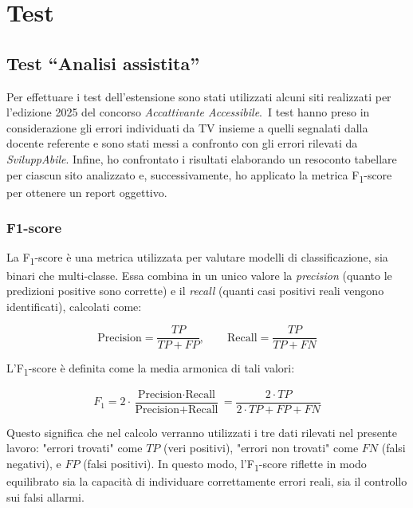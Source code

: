 
\DeclareRobustCommand{\wcagref}[2][]{%
  \hyperref[#1]{\textcolor{emerald}{#2}}%
}

\chapter{Test}
\label{chap:test}

\section{Test ``Analisi assistita''}
\noindent Per effettuare i test dell’estensione sono stati utilizzati alcuni siti realizzati per l'edizione 2025 del concorso \textit{Accattivante Accessibile}.\
I test hanno preso in considerazione gli errori individuati da TV insieme a quelli segnalati dalla docente referente e sono stati messi a confronto con gli errori rilevati da \textit{SviluppAbile}.
Infine, ho confrontato i risultati elaborando un resoconto tabellare per ciascun sito analizzato e, successivamente, ho applicato la metrica F\textsubscript{1}-score per ottenere un report oggettivo.

\subsection{F1-score}
\noindent La F\textsubscript{1}-score è una metrica utilizzata per valutare modelli di classificazione, sia binari che multi‐classe. Essa combina in un unico valore la \textit{precision} (quanto le predizioni positive sono corrette) e il \textit{recall} (quanti casi positivi reali vengono identificati), calcolati come:

\[
\text{Precision} = \frac{TP}{TP + FP}, 
\qquad
\text{Recall} = \frac{TP}{TP + FN}
\]

\vspace{0.5cm}
\noindent L’F\textsubscript{1}-score è definita come la media armonica di tali valori:

\[
F_{1} = 2 \cdot \frac{\text{Precision} \cdot \text{Recall}}{\text{Precision} + \text{Recall}}
 = \frac{2 \cdot TP}{2 \cdot TP + FP + FN}
\]
\vspace{0.1cm}

\noindent Questo significa che nel calcolo verranno utilizzati i tre dati rilevati nel presente lavoro:
"errori trovati" come \(TP\) (veri positivi), "errori non trovati" come \(FN\) (falsi negativi), e \(FP\) (falsi positivi).
In questo modo, l’F\textsubscript{1}-score riflette in modo equilibrato sia la capacità di individuare correttamente errori reali, sia il controllo sui falsi allarmi.\\

